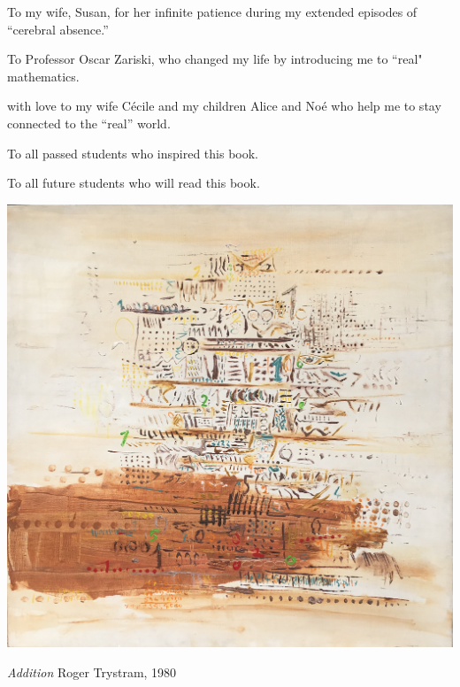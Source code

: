 %
%
%

\begin{dedication}
To my wife, Susan, for her infinite patience during my extended episodes of ``cerebral absence.''

\smallskip

\noindent
To Professor Oscar Zariski, who changed my life by introducing me to ``real" mathematics.
\smallskip

\noindent
with love to my wife C\'ecile and my children Alice and No\'e who help me to stay connected to the ``real'' world. 
\bigskip

\noindent To all passed students who inspired this book.

\noindent To all future students who will read this book.
\end{dedication}

\vspace*{.25in}

\centerline{\includegraphics[scale=0.75]{AdditionForSpringer.png}}

\medskip

\centerline{{\large\em  Addition} \hspace*{4.5in} {\small Roger Trystram, 1980}}


